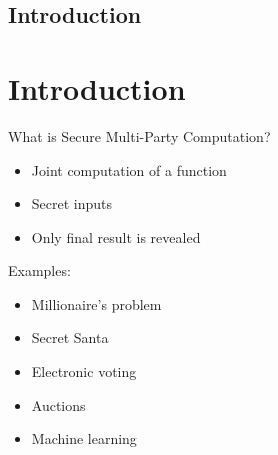 \section{Introduction}

\hypertarget{introduction}{%
\chapter{Introduction}\label{introduction}}

What is Secure Multi-Party Computation?

\begin{itemize}
\tightlist
\item
  Joint computation of a function
\item
  Secret inputs
\item
  Only final result is revealed
\end{itemize}

Examples:

\begin{itemize}
\tightlist
\item
  Millionaire's problem
\item
  Secret Santa
\item
  Electronic voting
\item
  Auctions
\item
  Machine learning
\end{itemize}
